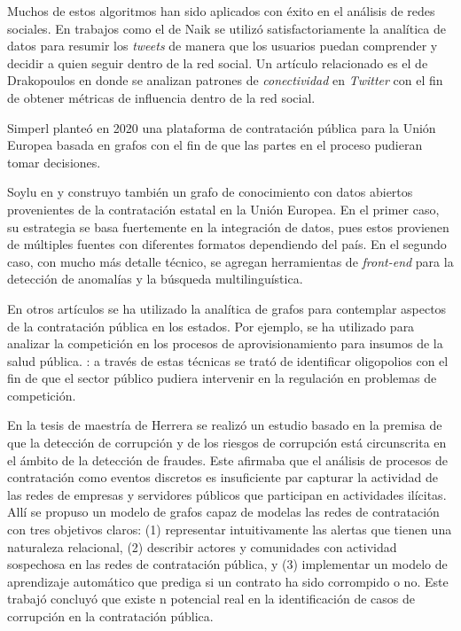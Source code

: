 \documentclass[11pt,letterpaper,oneside]{article}
\begin{document}
	Muchos de estos algoritmos han sido aplicados con éxito en el análisis de redes sociales. En trabajos como el de Naik \cite{Naik-2017} se utilizó satisfactoriamente la analítica de datos para resumir los \textit{tweets} de manera que los usuarios puedan comprender y decidir a quien seguir dentro de la red social. Un artículo relacionado es el de Drakopoulos \cite{Drakopoulos-2017} en donde se analizan patrones de \textit{conectividad} en \textit{Twitter} con el fin de obtener métricas de influencia dentro de la red social.
	
	Simperl \cite{Simperl-2018} planteó en 2020 una plataforma de contratación pública para la Unión Europea basada en grafos con el fin de que las partes en el proceso pudieran tomar decisiones.
	
	Soylu en \cite{Soylu-2020-1} y \cite{Soylu-2020-2} construyo también un grafo de conocimiento con datos abiertos provenientes de la contratación estatal en la Unión Europea. En el primer caso, su estrategia se basa fuertemente en la integración de datos, pues estos provienen de múltiples fuentes con diferentes formatos dependiendo del país. En el segundo caso, con mucho más detalle técnico, se agregan herramientas de {\em front-end} para la detección de anomalías y la búsqueda multilinguística.
	
	En otros artículos se ha utilizado la analítica de grafos para contemplar aspectos de la contratación pública en los estados. Por ejemplo, se ha utilizado para analizar la competición en los procesos de aprovisionamiento para insumos de la salud pública. \cite{Fountoukidis-2021}: a través de estas técnicas se trató de identificar oligopolios con el fin de que el sector público pudiera intervenir en la regulación en problemas de competición.
	
	En la tesis de maestría de Herrera \cite{Herrera-2019} se realizó un estudio basado en la premisa de que la detección de corrupción y de los riesgos de corrupción está circunscrita en el ámbito de la detección de fraudes. Este afirmaba que el análisis de procesos de contratación como eventos discretos es insuficiente par capturar la actividad de las redes de empresas y servidores públicos que participan en actividades ilícitas. Allí se propuso un modelo de grafos capaz de modelas las redes de contratación con tres objetivos claros: (1) representar intuitivamente las alertas que tienen una naturaleza relacional, (2) describir actores y comunidades con actividad sospechosa en las redes de contratación pública, y (3) implementar un modelo de aprendizaje automático que prediga si un contrato ha sido corrompido o no. Este trabajó concluyó que existe n potencial real en la identificación de casos de corrupción en la contratación pública.
	
\end{document}
